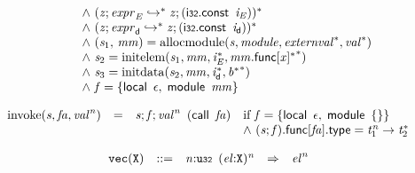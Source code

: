 $$\begin{array}{@{}lcl@{}l@{}}
 &&&\quad {\land}~({\mathit{z}} ; {\mathit{expr}}_{{\mathit{E}}} \hookrightarrow^\ast {\mathit{z}} ; (\mathsf{i{\scriptstyle32}}.\mathsf{const}~\,{\mathit{i}}_{{\mathit{E}}}))^\ast \\
 &&&\quad {\land}~({\mathit{z}} ; {\mathit{expr}}_{{\mathsf{d}}} \hookrightarrow^\ast {\mathit{z}} ; (\mathsf{i{\scriptstyle32}}.\mathsf{const}~\,{\mathit{i}}_{{\mathsf{d}}}))^\ast \\
 &&&\quad {\land}~({\mathit{s}}_{{1}},\, {\mathit{mm}}) = {\mathrm{allocmodule}}({\mathit{s}}, {\mathit{module}}, {{\mathit{externval}}^\ast}, {{\mathit{val}}^\ast}) \\
 &&&\quad {\land}~{\mathit{s}}_{{2}} = {\mathrm{initelem}}({\mathit{s}}_{{1}}, {\mathit{mm}}, {{\mathit{i}}_{{\mathit{E}}}^\ast}, {{{\mathit{mm}}.\mathsf{func}{}[{\mathit{x}}]^\ast}^\ast}) \\
 &&&\quad {\land}~{\mathit{s}}_{{3}} = {\mathrm{initdata}}({\mathit{s}}_{{2}}, {\mathit{mm}}, {{\mathit{i}}_{{\mathsf{d}}}^\ast}, {{{\mathit{b}}^\ast}^\ast}) \\
 &&&\quad {\land}~{\mathit{f}} = \{ \begin{array}[t]{@{}l@{}}
\mathsf{local}~\,\epsilon,\; \mathsf{module}~\,{\mathit{mm}} \}\end{array} \\
\end{array}
$$

\vspace{1ex}

$$
\begin{array}{@{}lcl@{}l@{}}
{\mathrm{invoke}}({\mathit{s}}, {\mathit{fa}}, {{\mathit{val}}^{{\mathit{n}}}}) &=& {\mathit{s}} ; {\mathit{f}} ; {{\mathit{val}}^{{\mathit{n}}}}~\,(\mathsf{call}~\,{\mathit{fa}}) &\quad
  \mbox{if}~{\mathit{f}} = \{ \begin{array}[t]{@{}l@{}}
\mathsf{local}~\,\epsilon,\; \mathsf{module}~\,\{ \begin{array}[t]{@{}l@{}}
 \}\end{array} \}\end{array} \\
 &&&\quad {\land}~({\mathit{s}} ; {\mathit{f}}).\mathsf{func}{}[{\mathit{fa}}].\mathsf{type} = {{\mathit{t}}_{{1}}^{{\mathit{n}}}} \rightarrow {{\mathit{t}}_{{2}}^\ast} \\
\end{array}
$$

\vspace{1ex}

$$
\begin{array}{@{}l@{}rrlll@{}l@{}}
& {\mathtt{vec}}({\mathtt{X}}) &::=& {\mathit{n}}{:}{\mathtt{u{\scriptstyle32}}}~\,{({\mathit{el}}{:}{\mathtt{X}})^{{\mathit{n}}}} &\Rightarrow& {{\mathit{el}}^{{\mathit{n}}}} \\
\end{array}
$$


